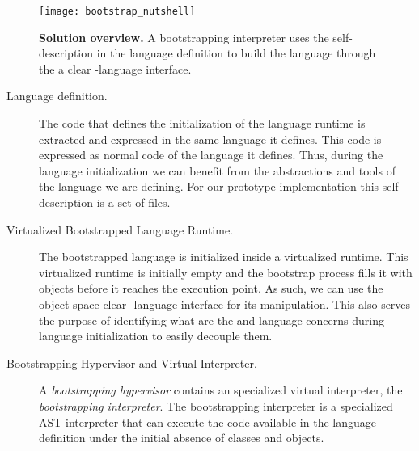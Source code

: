 \begin{figure}[ht]
\center
\texttt{[image: bootstrap\_nutshell]}
\caption{\textbf{Solution overview.} A bootstrapping interpreter uses the self-description in the language definition to build the language through the a clear \VM-language interface.\label{fig:bootstrapping_overview}}
\end{figure}

\begin{description}
\item[Language definition.] The code that defines the initialization of the language runtime is extracted and expressed in the same language it defines. This code is expressed as normal code of the language it defines. Thus, during the language initialization we can benefit from the abstractions and tools of the language we are defining. For our prototype implementation this self-description is a set of files.

\item[Virtualized Bootstrapped Language Runtime.] The bootstrapped language is initialized inside a virtualized runtime. This virtualized runtime is initially empty and the bootstrap process fills it with objects before it reaches the execution point. As such, we can use the object space clear \VM-language interface for its manipulation. This also serves the purpose of identifying what are the \VM and language concerns during language initialization to easily decouple them.

\item[Bootstrapping Hypervisor and Virtual Interpreter.] A \emph{bootstrapping hypervisor} contains an specialized virtual interpreter, the \emph{bootstrapping interpreter}. The bootstrapping interpreter is a specialized AST interpreter that can execute the code available in the language definition under the initial absence of classes and objects.
\end{description}



